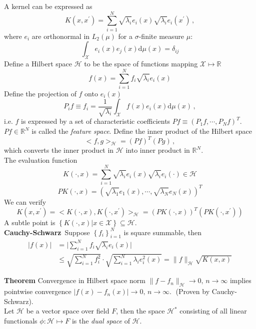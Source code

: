 \documentclass[a4paper,onecolumn]{article}
\begin{document}
\noindent A kernel can be expressed as
$$
    K(x,x^\prime) = \sum_{i=1}^N \sqrt{\lambda_i} e_i(x) \sqrt{\lambda_i}e_i(x^\prime)\,,
$$
where $e_i$ are orthonormal in $L_2(\mu)$ for a $\sigma$-finite measure $\mu$:
$$
    \int_\mathcal{X} e_i(x) e_j(x) \textrm{d} \mu(x) = \delta_{ij}
$$
Define a Hilbert space $\mathcal{H}$ to be the space of functions mapping $\mathcal{X}\mapsto \mathbb{R}$
$$
    f(x) = \sum_{i=1}^N f_i \sqrt{\lambda_i} e_i(x)
$$
Define the projection of $f$ onto $e_i(x)$
$$
    P_i f \equiv f_i = \frac{1}{\sqrt{\lambda_i}} \int_\mathcal{X} f(x) e_i(x) \textrm{d} \mu(x)\,,
$$
i.e. $f$ is expressed by a set of characteristic coefficients
$Pf \equiv \left(P_1 f,\cdots, P_N f\right)^T$. $Pf\in \mathbb{R}^N$ is called the \emph{feature space}.
Define the inner product of the Hilbert space
$$
    <f, g>_\mathcal{H} = (Pf)^T (Pg)\,,
$$
which converts the inner product in $\mathcal{H}$ into inner product in $\mathbb{R}^N$.\\

\noindent The evaluation function 
$$K(\cdot, x) = \sum_{i=1}^N \sqrt{\lambda_i} e_i(x)\sqrt{\lambda_i} e_i(\cdot) \in \mathcal{H}$$
$$PK(\cdot, x) = \left(\sqrt{\lambda_1}e_1(x),\cdots, \sqrt{\lambda_N}e_N(x) \right)^T$$
We can verify 
$$
    K(x, x^\prime) = <K(\cdot, x), K(\cdot, x^\prime)>_\mathcal{H} = \left(PK(\cdot, x)\right)^T \left(PK(\cdot, x^\prime)\right)
$$
A subtle point is $\left\{K(\cdot, x)\big| x\in \mathcal{X}\right\} \subseteq \mathcal{H}$.\\
\textbf{Cauchy-Schwarz}$\,$ Suppose $\left\{ f_i\right\}_{i=1}^N$ is square summable, then
\begin{equation*}\begin{split}
    \big| f(x)\big| &= \big|\sum_{i=1}^N f_i \sqrt{\lambda_i} e_i(x)\big| \\
    &\le \sqrt{\sum_{i=1}^N f_i^2} \cdot \sqrt{\sum_{i=1}^N \lambda_i e_i^2(x)} = \|f\|_\mathcal{H} \sqrt{K(x,x)}
\end{split} \end{equation*}

\noindent \textbf{Theorem} Convergence in Hilbert space norm $\|f-f_n\|_\mathcal{H}\rightarrow 0, \, n\rightarrow \infty$ implies
pointwise convergence $\big|f(x)-f_n(x)\big|\rightarrow 0, \, n\rightarrow \infty$. $\;$(Proven by Cauchy-Schwarz).\\

\noindent Let $\mathcal{H}$ be a vector space over field $F$, then the space $\mathcal{H}^*$ consisting
of all linear functionals $\phi: \mathcal{H}\mapsto F$ is the \emph{dual space} of $\mathcal{H}$.\\
\end{document}

